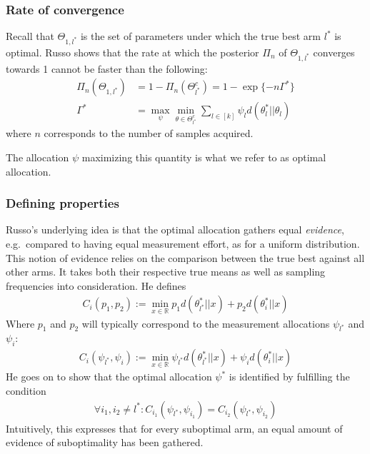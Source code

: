 \subsubsection{Rate of convergence}
Recall that $\Theta_{1, l^*}$ is the set of parameters under which the true best
arm $l^*$ is optimal. Russo \cite{DBLP:journals/corr/Russo16} shows that the
rate at which the posterior $\Pi_n$ of $\Theta_{1, l^*}$ converges towards 1
cannot be faster than the following:
\begin{align}
  \Pi_n(\Theta_{1, l^*}) &= 1 - \Pi_n(\Theta^c_{l^*}) = 1 - \exp\{-n\Gamma^*\} \\
  \Gamma^* &= \max_{\psi} \min_{\theta \in \Theta^c_{l^*}} \sum_{l \in [k]}
      \psi_l d(\theta_l^* || \theta_l)
\end{align}
where $n$ corresponds to the number of samples acquired.

The allocation $\psi$ maximizing this quantity is what we refer to as optimal
allocation.

\subsubsection{Defining properties}
Russo's underlying idea is that the optimal allocation gathers equal
\emph{evidence}, e.g.\ compared to having equal measurement effort, as  for a
uniform distribution. This notion of evidence relies on the comparison between
the true best against all other arms. It takes both their respective true means
as well as sampling frequencies into consideration. He defines
\begin{align}
  C_i(p_1, p_2) := \min_{x \in \mathbb{R}} p_1 d(\theta_{l^*}^*||x) + p_2
      d(\theta_{i}^*||x)
\end{align}
Where $p_1$ and $p_2$ will typically correspond to the measurement allocations
$\psi_{l^*}$ and $\psi_{i}$:
\begin{align}
  C_i(\psi_{l^*}, \psi_i) := \min_{x \in \mathbb{R}} \psi_{l^*}
      d(\theta_{l^*}^*||x) + \psi_i d(\theta_{i}^*||x)
\end{align}
He goes on to show that the optimal allocation $\psi^*$ is
identified by fulfilling the condition
\begin{align}
  \forall i_1, i_2 \neq l^*: C_{i_1}(\psi_{l^*}, \psi_{i_1}) =
      C_{i_2}(\psi_{l^*}, \psi_{i_2})
\end{align}
Intuitively, this expresses that for every suboptimal arm, an equal amount of
evidence of suboptimality has been gathered.

